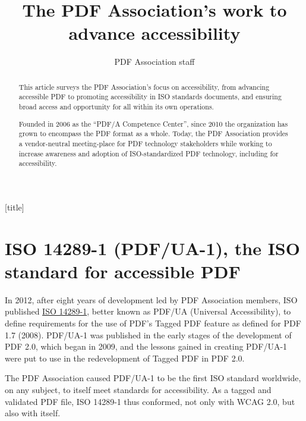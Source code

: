 \documentclass[12pt,a4paper]{article}
\title{The PDF Association’s work to advance accessibility}
\author{PDF Association staff}
\begin{document}
[title]{%
}


\maketitle



\begin{abstract}
This article surveys the PDF Association's focus on accessibility, from
advancing accessible PDF to promoting accessibility in ISO standards
documents, and ensuring broad access and opportunity for all within its
own operations.

Founded in 2006 as the ``PDF/A Competence Center'', since 2010 the
organization has grown to encompass the PDF format as a whole. Today,
the PDF Association provides a vendor-neutral meeting-place for PDF
technology stakeholders while working to increase awareness and adoption
of ISO-standardized PDF technology, including for accessibility.
\end{abstract}

\section{ISO 14289-1 (PDF/UA-1), the ISO standard for accessible
PDF}\label{iso-14289-1-pdfua-1-the-iso-standard-for-accessible-pdf}

In 2012, after eight years of development led by PDF Association
members, ISO published
\href{https://pdfa.org/resource/iso-14289-pdfua/}{ISO 14289-1}, better
known as PDF/UA (Universal Accessibility), to define requirements for
the use of PDF's Tagged PDF feature as defined for PDF 1.7 (2008).
PDF/UA-1 was published in the early stages of the development of PDF
2.0, which began in 2009, and the lessons gained in creating PDF/UA-1
were put to use in the redevelopment of Tagged PDF in PDF 2.0.

The PDF Association caused PDF/UA-1 to be the first ISO standard
worldwide, on any subject, to itself meet standards for accessibility.
As a tagged and validated PDF file, ISO 14289-1 thus conformed, not only
with WCAG 2.0, but also with itself. 🙂
\end{document}
